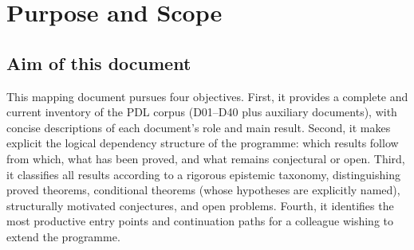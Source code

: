 \documentclass[11pt,a4paper]{article}
\theoremstyle{plain}
\theoremstyle{definition}
\theoremstyle{remark}
\begin{document}
\begin{abstract}
\begin{itemize}
D40 further identifies a deep structural connection between OP1 of the nuclear stability chain and the open problem of deriving the Bekenstein--Hawking coefficient $1/4$ from axioms (OP12/BH-3): both reduce to the same combinatorial question of counting coherent configurations on a collective PDL surface.
\item D41 confronts the PDL framework with the experimental results of Ha et al.\ (\textit{Nature Communications} 16, 10631, 2025), which reports an abrupt structural transition between $^{84}$Mo ($N=Z=42$, intruder 8p-8h) and $^{86}$Mo ($N=Z+2=44$).
Three independent observables from the published source data are consistent with the structural identity $T \approx (\Delta n+1)^2 = 25$: the B(E2) ratio ($22\%$ discrepancy, within experimental uncertainty), the DNO-SM wave-function component ratio $N_{\mathrm{comp}}(^{86}\text{Mo})/N_{\mathrm{comp}}(^{84}\text{Mo}) = 1.962$ vs.\ the PDL prediction $2.000$ ($2\%$ discrepancy), and the Shannon entropy difference $\Delta S_{\mathrm{WF}} = 0.868$ nats vs.\ $\ln 2 = 0.693$ nats ($25\%$ discrepancy).
D41 introduces the closure multiplicity conjecture H$_\mathrm{B}$ and formulates two falsifiable predictions for $^{88}$Ru/$^{90}$Ru and $^{92}$Pd/$^{94}$Pd testable at FRIB and RIKEN.
\end{itemize}
There is no longer any foundational open problem at the axiomatic level. The remaining open problems (OP2--OP16) concern higher-level derivations, extensions, and experimental confrontations.
\end{abstract}

\section{Purpose and Scope}
\label{sec:purpose}

\subsection{Aim of this document}
\label{subsec:aim}

This mapping document pursues four objectives.
First, it provides a complete and current inventory of the PDL corpus (D01--D40 plus auxiliary documents), with concise descriptions of each document's role and main result.
Second, it makes explicit the logical dependency structure of the programme: which results follow from which, what has been proved, and what remains conjectural or open.
Third, it classifies all results according to a rigorous epistemic taxonomy, distinguishing proved theorems, conditional theorems (whose hypotheses are explicitly named), structurally motivated conjectures, and open problems.
Fourth, it identifies the most productive entry points and continuation paths for a colleague wishing to extend the programme.
\end{document}
